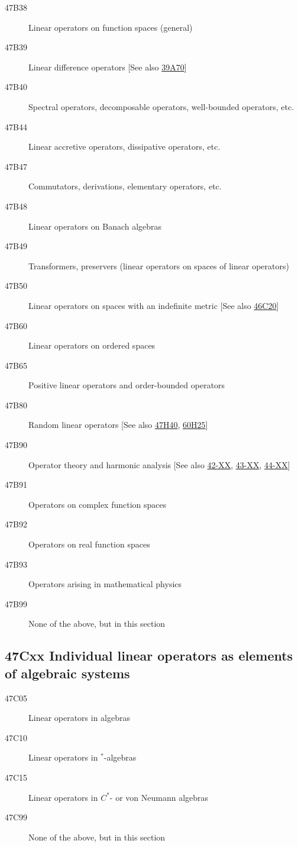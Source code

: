 \documentclass[letterpaper]{article}
\begin{document}
\begin{description}
\item [47B38]\label{47B38} Linear operators on function spaces (general)
\item [47B39]\label{47B39} Linear difference operators [See also \hyperref[39A70]{39A70}]
\item [47B40]\label{47B40} Spectral operators, decomposable operators, well-bounded operators, etc.
\item [47B44]\label{47B44} Linear accretive operators, dissipative operators, etc.
\item [47B47]\label{47B47} Commutators, derivations, elementary operators, etc.
\item [47B48]\label{47B48} Linear operators on Banach algebras
\item [47B49]\label{47B49} Transformers, preservers (linear operators on spaces of linear operators)
\item [47B50]\label{47B50} Linear operators on spaces with an indefinite metric [See also \hyperref[46C20]{46C20}]
\item [47B60]\label{47B60} Linear operators on ordered spaces
\item [47B65]\label{47B65} Positive linear operators and order-bounded operators
\item [47B80]\label{47B80} Random linear operators [See also \hyperref[47H40]{47H40}, \hyperref[60H25]{60H25}]
\item [47B90]\label{47B90} Operator theory and harmonic analysis [See also \hyperref[42-XX]{42-XX}, \hyperref[43-XX]{43-XX}, \hyperref[44-XX]{44-XX}]
\item [47B91]\label{47B91} Operators on complex function spaces
\item [47B92]\label{47B92} Operators on real function spaces
\item [47B93]\label{47B93} Operators arising in mathematical physics
\item [47B99]\label{47B99} None of the above, but in this section
\end{description}
\subsection*{47Cxx  Individual linear operators as elements of algebraic systems }\label{47Cxx}
\begin{description}  
\item [47C05]\label{47C05} Linear operators in algebras
\item [47C10]\label{47C10} Linear operators in ${}^*$-algebras
\item [47C15]\label{47C15} Linear operators in $C^*$- or von Neumann algebras
\item [47C99]\label{47C99} None of the above, but in this section
\end{description}
\end{document}
